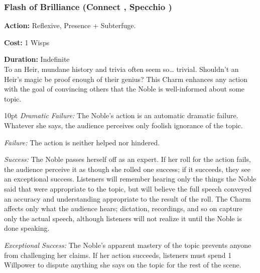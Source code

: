 

	
\subsubsection*{Flash of Brilliance (Connect \textbullet\textbullet, Specchio \textbullet\textbullet\textbullet)}

\noindent \textbf{Action:} Reflexive, Presence + Subterfuge.

\noindent \textbf{Cost:} 1 Wisps 

\noindent \textbf{Duration:} Indefinite\\

\noindent To an Heir, mundane history and trivia often seem so… trivial. Shouldn’t an Heir’s magic be proof enough of their genius? This Charm enhances any action with the goal of convincing others that the Noble is well-informed about some topic.

\begin{myindentpar}{10pt}    \emph{Dramatic Failure:} The Noble’s action is an automatic dramatic failure. Whatever she says, the audience perceives only foolish ignorance of the topic.

\emph{Failure:} The action is neither helped nor hindered.

\emph{Success:} The Noble passes herself off as an expert. If her roll for the action fails, the audience perceive it as though she rolled one success; if it succeeds, they see an exceptional success. Listeners will remember hearing only the things the Noble said that were appropriate to the topic, but will believe the full speech conveyed an accuracy and understanding appropriate to the result of the roll. The Charm affects only what the audience hears; dictation, recordings, and so on capture only the actual speech, although listeners will not realize it until the Noble is done speaking.

\emph{Exceptional Success:} The Noble’s apparent mastery of the topic prevents anyone from challenging her claims. If her action succeeds, listeners must spend 1 Willpower to dispute anything she says on the topic for the rest of the scene.

\end{myindentpar}
	
